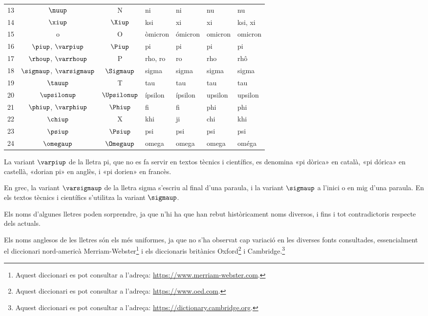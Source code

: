 \begin{center}
\begin{threeparttable}
\begin{tabular}{cccllll}
		13 & $\nuup$ & N & ni & ni &  nu & nu\\
		14 & $\xiup$ & $\Xiup$ & ksi & xi &  xi & ksi, xi\\
		15 & o & O & òmicron & ómicron &  omicron & omicron\\
		16 & $\piup$, $\varpiup$\tnote{\color{blue}(a)} & $\Piup$ & pi & pi &  pi & pi\\
		17 & $\rhoup$, $\varrhoup$ & P & rho, ro & ro &  rho & rhô\\
		18 & $\sigmaup$, $\varsigmaup$\tnote{\color{blue}(b)} & $\Sigmaup$ & sigma & sigma &  sigma &sigma\\
		19 & $\tauup$ & T & tau & tau & tau &tau\\
		20 & $\upsilonup$ & $\Upsilonup$ & ípsilon & ípsilon &  upsilon &upsilon\\
		21 & $\phiup$, $\varphiup$ & $\Phiup$ & fi & fi &  phi & phi\\
		22 & $\chiup$ & X & khi & ji &  chi & khi\\
		23 & $\psiup$ & $\Psiup$ & psi & psi &  psi & psi\\
		24 & $\omegaup$ & $\Omegaup$ & omega & omega &  omega & oméga\\
		\bottomrule[1pt]
	\end{tabular}
	\begin{tablenotes}
		\item[\color{blue}(a)] {\footnotesize La variant $\varpiup$ de la lletra pi, que no es fa servir en textos tècnics i científics, es denomina «pi dòrica» en  català, «pi dórica» en castellà, «dorian pi» en anglès, i «pi dorien» en francès.}
		\item[\color{blue}(b)] {\footnotesize En grec, la variant $\varsigmaup$ de la lletra sigma s'escriu  al final d'una paraula, i la variant $\sigmaup$  a l'inici o en mig d'una paraula. En els textos tècnics i científics s'utilitza  la variant $\sigmaup$.}
	\end{tablenotes}
\end{threeparttable}
\end{center}



Els noms d'algunes lletres poden sorprendre, ja que n'hi ha que han rebut històricament noms
diversos, i fins i tot contradictoris respecte dels actuals.

Els noms anglesos de les lletres són els més uniformes, ja que no
s'ha observat cap variació en les diverses fonts consultades, essencialment el diccionari nord-americà Merriam-Webster\footnote{Aquest diccionari es pot consultar a l'adreça: \href{https://www.merriam-webster.com/}{https:/\!\!/www.merriam-webster.com}.} i els diccionaris britànics Oxford\footnote{Aquest diccionari es pot consultar a l'adreça: \href{https://www.oed.com/}{https:/\!\!/www.oed.com}.} i Cambridge.\footnote{Aquest diccionari es pot consultar a l'adreça: \href{https://dictionary.cambridge.org/}{https:/\!\!/dictionary.cambridge.org}.}

